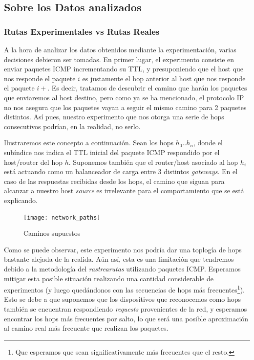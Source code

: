 
\subsection*{Sobre los Datos analizados}\label{sec:datos_analizados}

\subsubsection*{Rutas Experimentales vs Rutas Reales}
\par A la hora de analizar los datos obtenidos mediante la experimentaci\'on,
varias decisiones debieron ser tomadas. En primer lugar, el experimento consiste en
enviar paquetes ICMP incrementando su TTL, y presuponiendo que el host que
nos responde el paquete $i$ es justamente el hop anterior al host que nos
responde el paquete $i+$. Es decir, tratamos de descubrir el camino
que har\'an los paquetes que enviaremos al host destino, pero como ya
se ha mencionado, el protocolo IP no nos asegura que los paquetes vayan
a seguir el mismo camino para 2 paquetes distintos. As\'i pues, nuestro
experimento que nos otorga una serie de hops consecutivos podr\'ian, en la
realidad, no serlo.

\par Ilustraremos este concepto a continuaci\'on. Sean los hops $h_0..h_n$,
donde el sub\'indice nos indica el TTL inicial del paquete ICMP respondido por
el host/router del hop $h$. Suponemos tambi\'en que el router/host asociado al hop
$h_i$ est\'a actuando como un balanceador de carga entre 3 distintos
\textit{gateways}. En el caso de las respuestas recibidas desde los hops, el
camino que siguan para alcanzar a nuestro host \textit{source} es irrelevante
para el comportamiento que se est\'a explicando.

\begin{figure}[h]
    \centering
    \texttt{[image: network\_paths]}
    \caption{Caminos supuestos}
    \label{fig:network_paths}
\end{figure}

\par Como se puede observar, este experimento nos podr\'ia dar una toplog\'ia
de hops bastante alejada de la realida. A\'un as\'i, esta es una limitaci\'on
que tendremos debido a la metodolog\'ia del \textit{rastrearutas} utilizando
paquetes ICMP. Esperamos mitigar esta posible situaci\'on realizando una
cantidad considerable de experimentos (y luego qued\'andonos con
las secuencias de hops m\'as frecuentes\footnote{Que esperamos que sean
significativamente m\'as frecuentes que el resto.}). Esto se debe a que suponemos
que los dispositivos que reconocemos como hops tambi\'en se encuentran
respondiendo \textit{requests} provenientes de la red, y esperamos encontrar
los hops m\'as frecuentes por salto, lo que ser\'a una posible aproximaci\'on
al camino real m\'as frecuente que realizan los paquetes.

